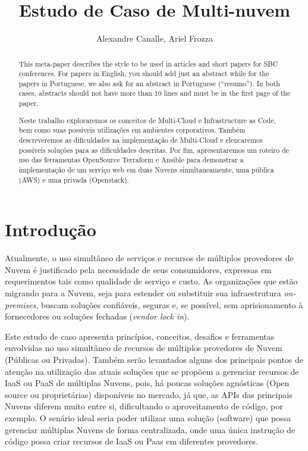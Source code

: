 \documentclass[12pt]{article}
\title{Estudo de Caso de Multi-nuvem}
\author{Alexandre Canalle\inst{1}, Ariel Frozza\inst{1}}
\begin{document}
\sloppy
\maketitle
	
\begin{abstract}
	This meta-paper describes the style to be used in articles and short papers
	for SBC conferences. For papers in English, you should add just an abstract
	while for the papers in Portuguese, we also ask for an abstract in
	Portuguese (``resumo''). In both cases, abstracts should not have more than
	10 lines and must be in the first page of the paper.
\end{abstract}

\begin{abstract} 
	Neste trabalho exploraremos os conceitos de Multi-Cloud e Infrastructure as Code, bem como suas possíveis utilizações em ambientes corporativos. Também descreveremos as dificuldades na implementação de Multi-Cloud e elencaremos possíveis soluções para as dificuldades descritas.  Por fim, apresentaremos um roteiro de uso das ferramentas OpenSource Terraform e Ansible para demonstrar a implementação de um serviço web em duas Nuvens simultaneamente, uma pública (AWS) e uma privada (Openstack).
\end{abstract}

	\section{Introdução}
	    Atualmente, o uso simultâneo de serviços e recursos de múltiplos provedores de Nuvem é justificado pela necessidade de seus consumidores, expressas em requerimentos tais como qualidade de serviço e custo. As organizações que estão migrando para a Nuvem, seja para estender ou substituir sua infraestrutura \textit{on-premises}, buscam soluções confiáveis, seguras e, se possível, sem aprisionamento à fornecedores ou soluções fechadas (\textit{vendor lock in}).
	    
	    Este estudo de caso apresenta princípios, conceitos, desafios e ferramentas envolvidas no uso simultâneo de recursos de múltiplos provedores de Nuvem (Públicas ou Privadas). Também serão levantados alguns dos principais pontos de atenção na utilização das atuais soluções que se propõem a gerenciar recursos de IaaS ou PaaS de múltiplas Nuvens, pois, há poucas soluções agnósticas (Open source ou proprietárias) disponíveis no mercado, já que, as APIs das principais Nuvens diferem muito entre si, dificultando o aproveitamento de código, por exemplo. O senário ideal seria poder utilizar uma solução (software) que possa gerenciar múltiplas Nuvens de forma centralizada, onde uma única instrução de código possa criar recursos de IaaS ou Paas em diferentes provedores.
	    
\end{document}
